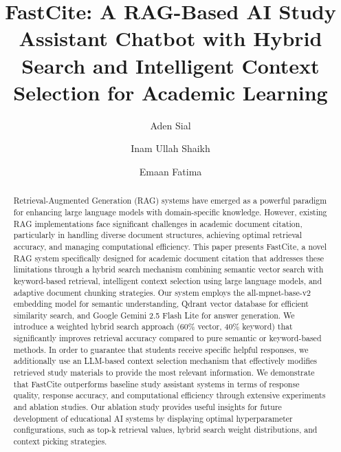 \documentclass[runningheads]{llncs}
\begin{document}
%
\title{FastCite: A RAG-Based AI Study Assistant Chatbot with Hybrid Search and Intelligent Context Selection for Academic Learning}
%
%
\author{Aden Sial \and
Inam Ullah Shaikh \and
Emaan Fatima}
%
%
%
\maketitle
%
\begin{abstract}
Retrieval-Augmented Generation (RAG) systems have emerged as a powerful paradigm for enhancing large language models with domain-specific knowledge. However, existing RAG implementations face significant challenges in academic document citation, particularly in handling diverse document structures, achieving optimal retrieval accuracy, and managing computational efficiency. This paper presents FastCite, a novel RAG system specifically designed for academic document citation that addresses these limitations through a hybrid search mechanism combining semantic vector search with keyword-based retrieval, intelligent context selection using large language models, and adaptive document chunking strategies. Our system employs the all-mpnet-base-v2 embedding model for semantic understanding, Qdrant vector database for efficient similarity search, and Google Gemini 2.5 Flash Lite for answer generation. We introduce a weighted hybrid search approach (60\% vector, 40\% keyword) that significantly improves retrieval accuracy compared to pure semantic or keyword-based methods. In order to guarantee that students receive specific helpful responses, we additionally use an LLM-based context selection mechanism that effectively modifies retrieved study materials to provide the most relevant information. We demonstrate that FastCite outperforms baseline study assistant systems in terms of response quality, response accuracy, and computational efficiency through extensive experiments and ablation studies. Our ablation study provides useful insights for future development of educational AI systems by displaying optimal hyperparameter configurations, such as top-k retrieval values, hybrid search weight distributions, and context picking strategies.
\end{abstract}
%
%
%
\end{document}
